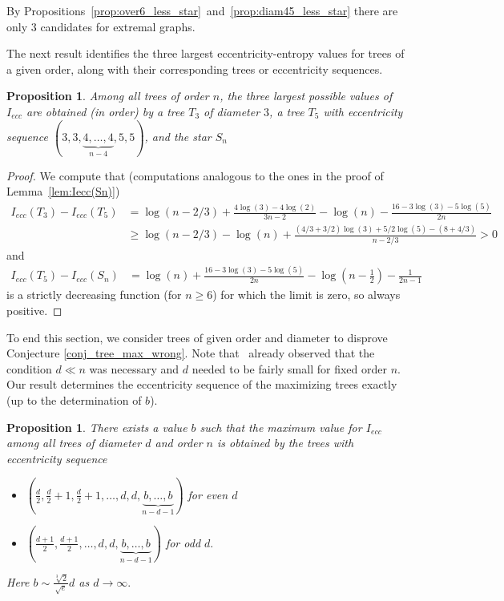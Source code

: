 \documentclass{article}
\newtheorem{prop}[defi]{Proposition}
\newcommand{\ecc}{ecc}
\begin{document}
{By Propositions~\ref{prop:over6_less_star}~and~\ref{prop:diam45_less_star} there are only $3$ candidates for
extremal graphs.





The next result identifies the three largest eccentricity-entropy values for trees of a given order, along with their corresponding trees or eccentricity sequences.


\begin{prop}
    Among all trees of order $n$, the three largest possible values of $I_{\ecc}$ are obtained (in order) by a tree $T_3$
     of diameter $3$, a tree $T_5$ with
        eccentricity
        sequence $(3,3,\underbrace{4,\ldots,4}_{n-4},5,5)$, and the star $S_n$
\end{prop}

\begin{proof}
We compute that (computations analogous to the ones in the proof of Lemma~\ref{lem:Iecc(Sn)})
\begin{align*}
    I_{ecc}(T_3)-I_{ecc}(T_5)&=\log(n-2/3)+\frac{4\log(3)-4\log(2)}{3n-2}-\log(n)-\frac{16-3\log(3)-5\log(5)}{2n}\\
    &\ge \log(n-2/3)-\log(n)+\frac{(4/3+3/2)\log(3) +5/2 \log(5) - (8+4/3)  }{n-2/3}>0
\end{align*}
and 
\begin{align*}
I_{ecc}(T_5) -I_{\ecc}(S_n)&=\log(n)+\frac{16-3\log(3)-5\log(5)}{2n}-\log\left(n-\frac{1}{2}\right)-\frac{1}{2n-1}\end{align*} is a strictly decreasing function (for $n\ge 6$) for which the limit is zero, so always positive.
\end{proof}








To end this section, we consider trees of given order and diameter to disprove Conjecture \ref{conj_tree_max_wrong}.
Note that~\cite[Rem.~4.4]{Dehmer_Kraus} already observed that the condition $d\ll n$ was necessary and $d$ needed to be fairly small for fixed order $n$.
Our result determines the eccentricity sequence of the maximizing trees exactly (up to the determination of $b$).

\begin{prop}\label{prop:tree_max_entropy_0.764d}
There exists a value $b$ such that the maximum value for $I_{{ecc}}$ among all trees of diameter $d$ and order $n$ is obtained by the trees with eccentricity sequence
\begin{itemize}
  \item $(\frac{d}{2},\frac{d}{2}+1,\frac{d}{2}+1,\ldots,d,d,\underbrace{b,\ldots,b}_{n-d-1})$ 
      for even $d$
  \item $(\frac{d+1}{2},\frac{d+1}{2},\ldots,d,d,\underbrace{b,\ldots,b}_{n-d-1})$ 
      for odd $d.$
\end{itemize}
Here $b\sim\frac{\sqrt[3]{2}}{\sqrt{e}}d$ as $ d \to \infty.$
\end{prop}

}
\end{document}
